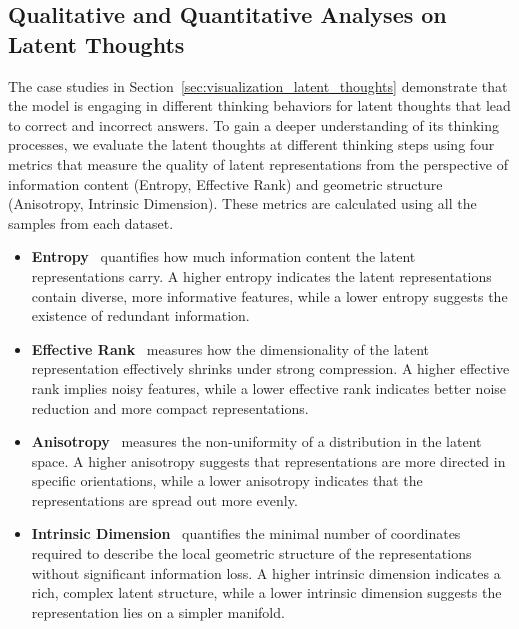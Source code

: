 \documentclass{article} %
\begin{document}
\subsection{Qualitative and Quantitative Analyses on Latent Thoughts}\label{sec:representation_quality_metrics}
The case studies in Section~\ref{sec:visualization_latent_thoughts} demonstrate that the model is engaging in different thinking behaviors for latent thoughts that lead to correct and incorrect answers. 
%
To gain a deeper understanding of its thinking processes, we evaluate the latent thoughts at different thinking steps using four metrics that measure the quality of latent representations from the perspective of information content (Entropy, Effective Rank) and geometric structure (Anisotropy, Intrinsic Dimension). These metrics are calculated using all the samples from each dataset.
%
\begin{itemize}[noitemsep,nolistsep,leftmargin=*]
\item \textbf{Entropy}~\citep{skean2025layer} quantifies how much information content the latent representations carry. A higher entropy indicates the latent representations contain diverse, more informative features, while a lower entropy suggests the existence of redundant information.
\item \textbf{Effective Rank}~\citep{wei2024DiffeRank} measures how the dimensionality of the latent representation effectively shrinks under strong compression.
A higher effective rank implies noisy features, while a lower effective rank indicates better noise reduction and more compact representations.

\item \textbf{Anisotropy}~\citep{razzhigaev2024shape} measures the non-uniformity of a distribution in the latent space. A higher anisotropy
suggests that representations are more directed
in specific orientations, while a lower anisotropy indicates that the representations are spread out more evenly.
\item \textbf{Intrinsic Dimension}~\citep{facco2017estimating,cheng2025emergence} quantifies the minimal number of coordinates required to describe the local geometric structure of the representations without significant information loss. A higher intrinsic dimension indicates a rich, complex latent structure, while a lower intrinsic dimension suggests the representation lies on a simpler manifold.

\end{itemize}
\end{document}
